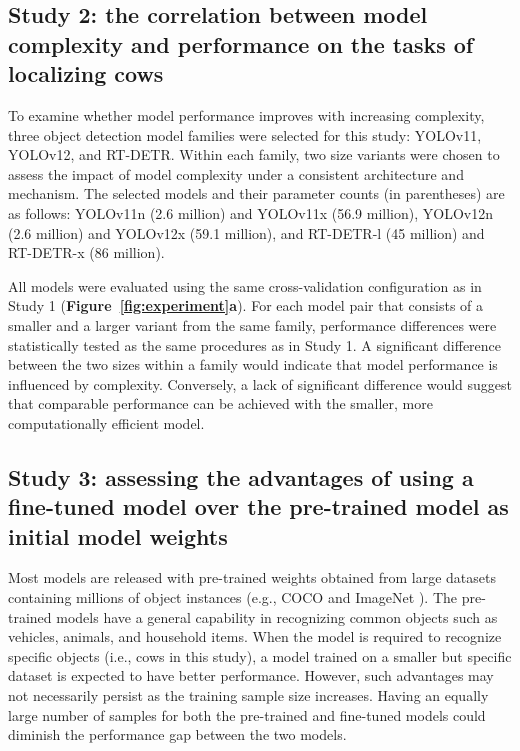 \subsection*{Study 2: the correlation between model complexity and performance on the tasks of localizing cows}

To examine whether model performance improves with increasing complexity, three object detection model families were selected for this study: YOLOv11, YOLOv12, and RT-DETR. Within each family, two size variants were chosen to assess the impact of model complexity under a consistent architecture and mechanism. The selected models and their parameter counts (in parentheses) are as follows: YOLOv11n (2.6 million) and YOLOv11x (56.9 million), YOLOv12n (2.6 million) and YOLOv12x (59.1 million), and RT-DETR-l (45 million) and RT-DETR-x (86 million).

All models were evaluated using the same cross-validation configuration as in Study 1 (\textbf{Figure~\ref{fig:experiment}a}). For each model pair that consists of a smaller and a larger variant from the same family, performance differences were statistically tested as the same procedures as in Study 1. A significant difference between the two sizes within a family would indicate that model performance is influenced by complexity. Conversely, a lack of significant difference would suggest that comparable performance can be achieved with the smaller, more computationally efficient model.

\subsection*{Study 3: assessing the advantages of using a fine-tuned model over the pre-trained model as initial model weights}

Most models are released with pre-trained weights obtained from large datasets containing millions of object instances (e.g., COCO \cite{lin2014microsoft} and ImageNet \cite{deng2009imagenet}). The pre-trained models have a general capability in recognizing common objects such as vehicles, animals, and household items. When the model is required to recognize specific objects (i.e., cows in this study), a model trained on a smaller but specific dataset is expected to have better performance. However, such advantages may not necessarily persist as the training sample size increases. Having an equally large number of samples for both the pre-trained and fine-tuned models could diminish the performance gap between the two models.

